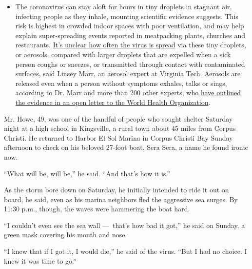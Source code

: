 \begin{itemize}
  \begin{itemize}
  \tightlist
  \item
    The coronavirus
    \href{https://www.nytimes.com/2020/07/04/health/239-experts-with-one-big-claim-the-coronavirus-is-airborne.html?action=click\&pgtype=Article\&state=default\&region=MAIN_CONTENT_3\&context=storylines_faq}{can
    stay aloft for hours in tiny droplets in stagnant air}, infecting
    people as they inhale, mounting scientific evidence suggests. This
    risk is highest in crowded indoor spaces with poor ventilation, and
    may help explain super-spreading events reported in meatpacking
    plants, churches and restaurants.
    \href{https://www.nytimes.com/2020/07/06/health/coronavirus-airborne-aerosols.html?action=click\&pgtype=Article\&state=default\&region=MAIN_CONTENT_3\&context=storylines_faq}{It's
    unclear how often the virus is spread} via these tiny droplets, or
    aerosols, compared with larger droplets that are expelled when a
    sick person coughs or sneezes, or transmitted through contact with
    contaminated surfaces, said Linsey Marr, an aerosol expert at
    Virginia Tech. Aerosols are released even when a person without
    symptoms exhales, talks or sings, according to Dr. Marr and more
    than 200 other experts, who
    \href{https://academic.oup.com/cid/article/doi/10.1093/cid/ciaa939/5867798}{have
    outlined the evidence in an open letter to the World Health
    Organization}.
  \end{itemize}
\end{itemize}

Mr. Howe, 49, was one of the handful of people who sought shelter
Saturday night at a high school in Kingsville, a rural town about 45
miles from Corpus Christi. He returned to Harbor El Sol Marina in Corpus
Christi Bay Sunday afternoon to check on his beloved 27-foot boat, Sera
Sera, a name he found ironic now.

``What will be, will be,'' he said. ``And that's how it is.''

As the storm bore down on Saturday, he initially intended to ride it out
on board, he said, even as his marina neighbors fled the aggressive sea
surges. By 11:30 p.m., though, the waves were hammering the boat hard.

``I couldn't even see the sea wall ---~that's how bad it got,'' he said
on Sunday, a green mask covering his mouth and nose.

``I knew that if I got it, I would die,'' he said of the virus. ``But I
had no choice. I knew it was time to go.''


